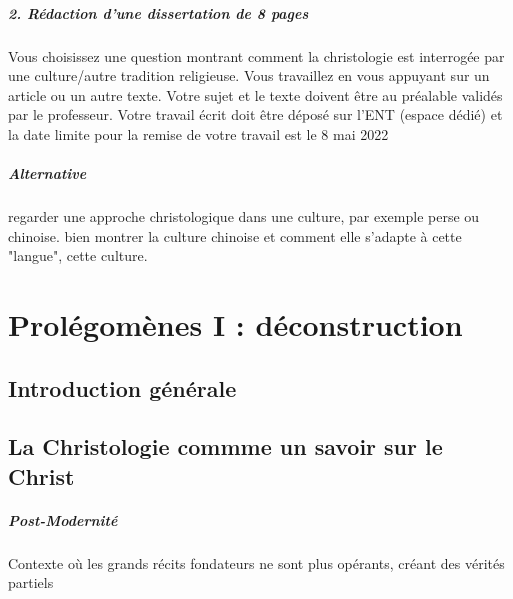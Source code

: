 \paragraph{2. Rédaction d’une dissertation de 8 pages}
Vous choisissez une question montrant comment la christologie est interrogée par une
culture/autre tradition religieuse. Vous travaillez en vous appuyant sur un article ou un autre
texte.
Votre sujet et le texte doivent être au préalable validés par le professeur.
Votre travail écrit doit être déposé sur l’ENT (espace dédié) et la date limite pour la
remise de votre travail est le 8 mai 2022

\paragraph{Alternative} regarder une approche christologique dans une culture, par exemple perse ou chinoise. 
bien montrer la culture chinoise et comment elle s'adapte à cette "langue", cette culture.
\chapter{Prolégomènes I : déconstruction}

\section{Introduction générale}

\section{La Christologie commme un savoir sur le Christ}
\paragraph{Post-Modernité}
\begin{Def}
Contexte où les grands récits fondateurs ne sont plus opérants, créant des vérités partiels
\end{Def}

